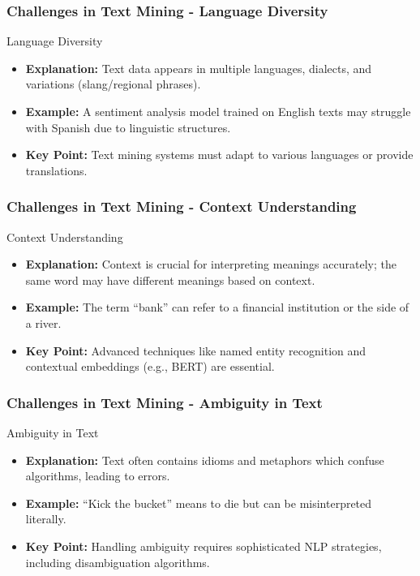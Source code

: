 \documentclass[aspectratio=169]{beamer}
\begin{document}
\begin{frame}[fragile]
    \frametitle{Challenges in Text Mining - Language Diversity}
    \begin{block}{Language Diversity}
        \begin{itemize}
            \item \textbf{Explanation:} Text data appears in multiple languages, dialects, and variations (slang/regional phrases).
            \item \textbf{Example:} A sentiment analysis model trained on English texts may struggle with Spanish due to linguistic structures.
            \item \textbf{Key Point:} Text mining systems must adapt to various languages or provide translations.
        \end{itemize}
    \end{block}
\end{frame}

\begin{frame}[fragile]
    \frametitle{Challenges in Text Mining - Context Understanding}
    \begin{block}{Context Understanding}
        \begin{itemize}
            \item \textbf{Explanation:} Context is crucial for interpreting meanings accurately; the same word may have different meanings based on context.
            \item \textbf{Example:} The term “bank” can refer to a financial institution or the side of a river.
            \item \textbf{Key Point:} Advanced techniques like named entity recognition and contextual embeddings (e.g., BERT) are essential.
        \end{itemize}
    \end{block}
\end{frame}

\begin{frame}[fragile]
    \frametitle{Challenges in Text Mining - Ambiguity in Text}
    \begin{block}{Ambiguity in Text}
        \begin{itemize}
            \item \textbf{Explanation:} Text often contains idioms and metaphors which confuse algorithms, leading to errors.
            \item \textbf{Example:} “Kick the bucket” means to die but can be misinterpreted literally.
            \item \textbf{Key Point:} Handling ambiguity requires sophisticated NLP strategies, including disambiguation algorithms.
        \end{itemize}
    \end{block}
\end{frame}
\end{document}
